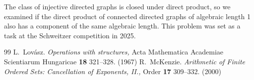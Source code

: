 \documentclass[a4paper]{article} %
\begin{document}
The class of injective directed graphs is closed under direct product, so we examined if the direct product of  connected directed graphs of algebraic length 1 also has a component of the same algebraic length. This problem was set as a task at the Schweitzer competition in 2025.

\begin{thebibliography}{99}
L.~Lov\'{a}sz.
\newblock \emph{Operations with structures,}
\newblock Acta Mathematica Academiae Scientiarum Hungaricae \textbf{18} 321--328. (1967)
R.~McKenzie.
\newblock \emph{Arithmetic of Finite Ordered Sets: Cancellation of Exponents, II.,}
\newblock Order \textbf{17} 309--332. (2000)

\end{thebibliography}
\end{document}
